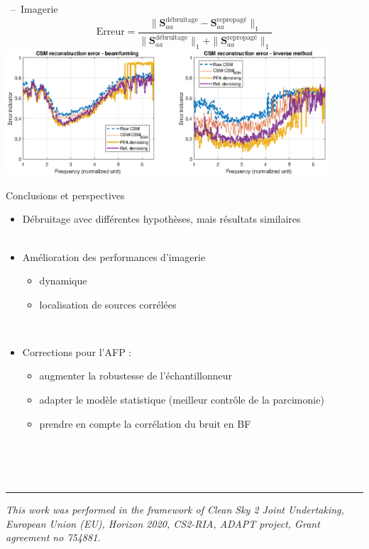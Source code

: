 \documentclass[10pt,xcolor=x11names,compress, show notes]{beamer}%
\begin{document}
\begin{frame}{\insertsectionhead~--~Imagerie}
	\centering
	\small
	\begin{equation*}
        		\text{Erreur} = \frac{\|\bm{S}_{aa}^{\text{débruitage}}-\bm{S}_{aa}^{\text{repropagé}}\|_1}{\|\bm{S}_{aa}^{\text{débruitage}}\|_1+\|\bm{S}_{aa}^{\text{repropagé}}\|_1}
	\end{equation*}
	\vfill
	\includegraphics[width=0.9\textwidth]{airbus/erreur.eps}
\end{frame}

\begin{frame}{Conclusions et perspectives}
\begin{itemize}
	\item Débruitage avec différentes hypothèses, mais résultats similaires\\~\\
        \item Amélioration des performances d'imagerie
        \begin{itemize}
       		 \item dynamique
        		\item localisation de sources corrélées
	\end{itemize}~\\
	
	\item Corrections pour l'AFP :
	\begin{itemize}
        		\item augmenter la robustesse de l'échantillonneur
        		\item adapter le modèle statistique (meilleur contrôle de la parcimonie)
        		\item prendre en compte la corrélation du bruit en BF
	\end{itemize}
\end{itemize}

~\\~\\~\\
\vfill

\begin{center}
	\noindent\rule{\textwidth}{0.4pt}
	\scriptsize \itshape{
	This work was performed in the framework of Clean Sky 2 Joint Undertaking, European Union (EU), Horizon 2020, CS2-RIA, ADAPT project, Grant agreement no 754881.}\\
\end{center}

\end{frame}
\end{document}
